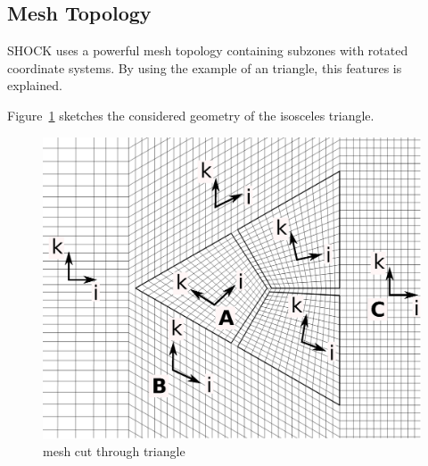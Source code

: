\subsection{Mesh Topology}
SHOCK uses a powerful mesh topology containing subzones with rotated coordinate systems.
By using the example of an triangle, this features is explained.
\par
Figure~\ref{fig:triangle} sketches the considered geometry of the isosceles triangle.

\begin{figure}[!ht]
  \begin{center} 
    \includegraphics[width=0.7\linewidth]{grid_transformation}
  \end{center}
  \caption {mesh cut through triangle}
  \label{fig:triangle}
\end{figure}

